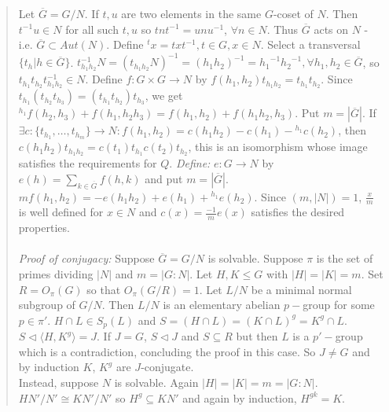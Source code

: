 \begin{quote}
Let $\overline{G}= G/N$.  If $t, u$ are two elements in
the same $G$-coset of $N$.
Then $t^{-1}u \in N$ for all such $t, u$
so $tnt^{-1}=unu^{-1}$, $\forall n \in N$.
Thus $\overline{G}$ acts on $N$ - i.e. $\overline{G} \subset Aut(N)$.
Define $^tx=txt^{-1}, t \in G, x \in N$.
Select a transversal $\{t_{h} | h \in \overline{G}\}$.
$t^{-1}_{h_1 h_2}N = (t_{h_1h_2}N)^{-1}=
(h_1h_2)^{-1} = {h_1}^{-1}{h_2}^{-1}, \forall h_1 , h_2 \in \overline{G}$, so 
$t_{h_1}t_{h_2} t^{-1}_{h_1 h_2} \in N$.
Define $f: G \times G \rightarrow N$ by
$f(h_1, h_2) t_{h_1 h_2} = t_{h_1} t_{h_2}$.  Since
$t_{h_1}(t_{h_2} t_{h_3}) = (t_{h_1}t_{h_2}) t_{h_3}$, we get
$ {^{h_1}} f(h_2, h_3)+ f(h_1, h_2 h_3)= f(h_1, h_2)+ f(h_1 h_2 , h_3)$.
Put $m= |\overline{G}|$.  If 
$\exists c:\{t_{h_1}, \ldots , t_{h_m}\} \rightarrow N: 
f(h_1 , h_2)= c(h_1 h_2) -c(h_1) - {^{h_1}} c(h_2)$, then
$c(h_1 h_2) t_{h_1 h_2}= c(t_1)t_{h_1} c(t_2) t_{h_2}$, this is an isomorphism
whose image satisfies the requirements for $Q$.  
\emph{Define:} $e: G \rightarrow N$ by
$e(h) = \sum_{k \in \overline{G}} f(h , k)$ and put $m= |\overline{G}|$.
$m f( h_1 , h_2 )=  -e(h_1 h_2) + e(h_1) + {^{h_1}}e(h_2)$.  Since $(m, |N|)=1$,
${\frac x m}$ is well defined for $ x \in N$ and
$c(x)= {\frac {-1} m} e(x)$ satisfies the desired properties.
\\
\\
\emph{Proof of conjugacy:}
Suppose $\overline{G}=G/N$ is solvable. Suppose $\pi$ is the set of primes 
dividing $|N|$ and $m=|G:N|$. Let $H,K \le G$ with $|H|=|K|=m$.  
Set $R=O_{\pi}(G)$ so that $O_{\pi}(G/R) = 1$.  
Let $L/N$ be a minimal
normal subgroup of $G/N$.
Then $L/N$ is an elementary abelian $p-$group for some $p \in \pi'$.
$H\cap L \in S_p(L)$ and
$S=(H \cap L)=(K \cap L)^g= K^g \cap L$.
$S \lhd \langle H, K^g \rangle = J$.  
If $J = G$, $S \lhd J$ and
$S \subseteq R$ but then $L$ is a $p'-$group which is a contradiction,
concluding the proof in this case.  So
$J \ne G$ and by induction $K$, $K^g$ are $J$-conjugate.  
\\
Instead, suppose
$N$ is solvable.  Again $|H|=|K|=m=|G:N|$.  
$HN'/N' \cong KN'/N'$ so $H^g \subseteq KN'$ and
again by induction, $H^{gk}= K$.
\end{quote}
